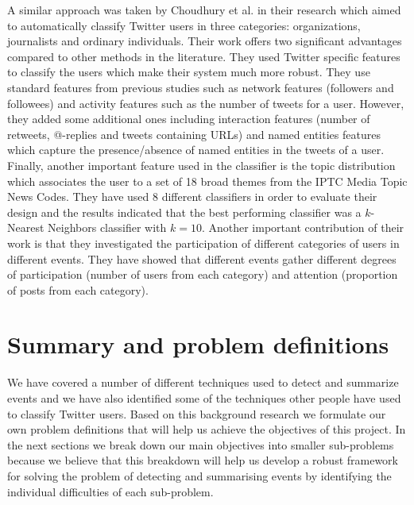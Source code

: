 A similar approach was taken by Choudhury et al. \citep{Choudhury} in their research which aimed to automatically classify Twitter users in three categories: organizations, journalists and ordinary individuals. Their work offers two significant advantages compared to other methods in the literature. They used Twitter specific features to classify the users which make their system much more robust. They use standard features from previous studies such as network features (followers and followees) and activity features such as the number of tweets for a user. However, they added some additional ones including interaction features (number of retweets, @-replies and tweets containing URLs) and named entities features which capture the presence/absence of named entities in the tweets of a user. Finally, another important feature used in the classifier is the topic distribution which associates the user to a set of 18 broad themes from the IPTC Media Topic News Codes. They have used 8 different classifiers in order to evaluate their design and the results indicated that the best performing classifier was a $k$-Nearest Neighbors classifier with $k = 10$. Another important contribution of their work is that they investigated the participation of different categories of users in different events. They have showed that different events gather different degrees of participation (number of users from each category) and attention (proportion of posts from each category). 

\section{Summary and problem definitions}
We have covered a number of different techniques used to detect and summarize events and we have also identified some of the techniques other people have used to classify Twitter users. Based on this background research we formulate our own problem definitions that will help us achieve the objectives of this project. In the next sections we break down our main objectives into smaller sub-problems because we believe that this breakdown will help us develop a robust framework for solving the problem of detecting and summarising events by identifying the individual difficulties of each sub-problem.  	

